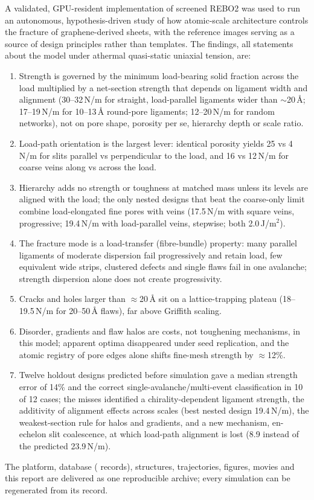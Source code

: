 A validated, GPU-resident implementation of screened REBO2 was used to run an autonomous, hypothesis-driven study of how atomic-scale architecture controls the fracture of graphene-derived sheets, with the reference images serving as a source of design principles rather than templates. The findings, all statements about the \rebo{} model under athermal quasi-static uniaxial tension, are:
\begin{enumerate}
\item Strength is governed by the minimum load-bearing solid fraction across the load multiplied by a net-section strength that depends on ligament width and alignment (30--32\,N/m for straight, load-parallel ligaments wider than $\sim$20\,\AA; 17--19\,N/m for 10--13\,\AA{} round-pore ligaments; 12--20\,N/m for random networks), not on pore shape, porosity per se, hierarchy depth or scale ratio.
\item Load-path orientation is the largest lever: identical porosity yields 25 vs 4\,N/m for slits parallel vs perpendicular to the load, and 16 vs 12\,N/m for coarse veins along vs across the load.
\item Hierarchy adds no strength or toughness at matched mass unless its levels are aligned with the load; the only nested designs that beat the coarse-only limit combine load-elongated fine pores with veins (17.5\,N/m with square veins, progressive; 19.4\,N/m with load-parallel veins, stepwise; both 2.0\,J/m$^2$).
\item The fracture mode is a load-transfer (fibre-bundle) property: many parallel ligaments of moderate dispersion fail progressively and retain load, few equivalent wide strips, clustered defects and single flaws fail in one avalanche; strength dispersion alone does not create progressivity.
\item Cracks and holes larger than $\approx$20\,\AA{} sit on a lattice-trapping plateau (18--19.5\,N/m for 20--50\,\AA{} flaws), far above Griffith scaling.
\item Disorder, gradients and flaw halos are costs, not toughening mechanisms, in this model; apparent optima disappeared under seed replication, and the atomic registry of pore edges alone shifts fine-mesh strength by $\approx$12\%.
\item Twelve holdout designs predicted before simulation gave a median strength error of 14\% and the correct single-avalanche/multi-event classification in 10 of 12 cases; the misses identified a chirality-dependent ligament strength, the additivity of alignment effects across scales (best nested design 19.4\,N/m), the weakest-section rule for halos and gradients, and a new mechanism, en-echelon slit coalescence, at which load-path alignment is lost (8.9 instead of the predicted 23.9\,N/m).
\end{enumerate}
The platform, database (\nRuns{} records), structures, trajectories, figures, movies and this report are delivered as one reproducible archive; every simulation can be regenerated from its record.
